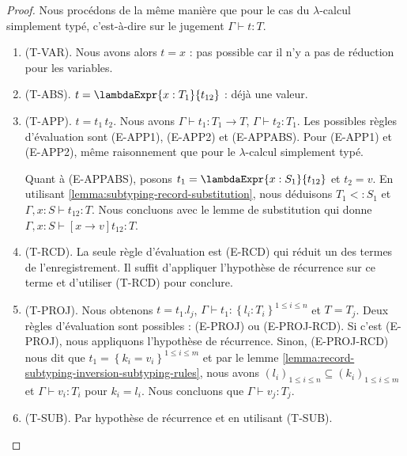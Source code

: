 \begin{proof}
  Nous procédons de la même manière que pour le cas du $\lambda$-calcul
  simplement typé, c'est-à-dire sur le jugement $\Gamma \vdash t : T$.
  \begin{enumerate}
    \item (T-VAR). Nous avons alors $t = x$ : pas possible car il n'y a pas de
      réduction pour les variables.
      \item (T-ABS). $t = \lambdaExpr{x : T_{1}}{t_{12}}$ : déjà une valeur.
      \item (T-APP). $t = t_{1} \, t_{2}$. Nous avons
          $\Gamma \vdash t_{1} : T_{1} \rightarrow T$, $\Gamma \vdash t_{2}
          : T_{1}$.
          Les possibles règles d'évaluation
          sont (E-APP1), (E-APP2) et (E-APPABS). Pour (E-APP1) et (E-APP2), même
          raisonnement que pour le $\lambda$-calcul simplement typé.

          Quant à (E-APPABS), posons $t_{1} = \lambdaExpr{x : S_{1}}{t_{12}}$
          et $t_{2} = v$. En utilisant
          \ref{lemma:subtyping-record-substitution}, nous déduisons $T_{1} <:
          S_{1}$ et $\Gamma, x : S \vdash t_{12} : T$. Nous concluons avec le lemme de
          substitution qui donne $\Gamma, x : S \vdash [x \rightarrow v]t_{12} :
          T$.

       \item (T-RCD). La seule règle d'évaluation est (E-RCD) qui réduit un des
         termes de l'enregistrement. Il suffit d'appliquer l'hypothèse de
         récurrence sur ce terme et d'utiliser (T-RCD) pour conclure.

       \item (T-PROJ). Nous obtenons $t = t_{1}.l_{j}$, $\Gamma \vdash t_{1}
         : \left\{ l_{i} : T_{i} \right\}^{1 \leq i \leq n}$ et $T = T_{j}$.
         Deux règles d'évaluation sont possibles : (E-PROJ) ou (E-PROJ-RCD). Si
         c'est (E-PROJ), nous appliquons l'hypothèse de récurrence. Sinon,
         (E-PROJ-RCD) nous dit que $t_{1} = \left\{ k_{i} = v_{i} \right\}^{1
           \leq i \leq m}$ et par le lemme
         \ref{lemma:record-subtyping-inversion-subtyping-rules}, nous avons
         $(l_{i})_{1 \leq i \leq n} \subseteq (k_{i})_{1 \leq i \leq m}$ et
         $\Gamma \vdash v_{i} : T_{i}$ pour $k_{i} = l_{i}$. Nous concluons
         que $\Gamma \vdash v_{j} : T_{j}$.

       \item (T-SUB). Par hypothèse de récurrence et en utilisant (T-SUB).
  \end{enumerate}
\end{proof}

